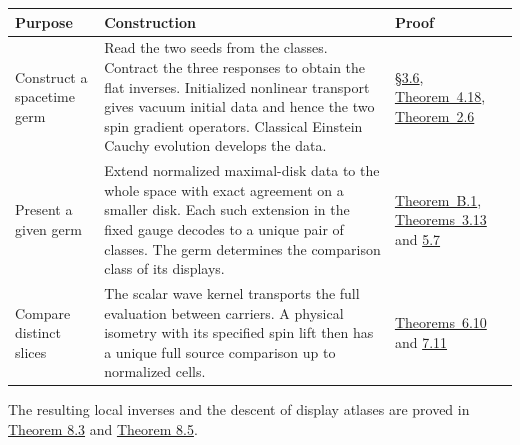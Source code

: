 \documentclass[
  english,
  11pt,
  reqno]{amsart}
\newcounter{none} %
\begin{document}
{\def\LTcaptype{none} %
\begin{longtable}[]{@{}
  >{\raggedright\arraybackslash}p{}
  >{\raggedright\arraybackslash}p{}
  >{\raggedright\arraybackslash}p{}@{}}
\toprule\noalign{}
\begin{minipage}[b]{\linewidth}\raggedright
Purpose
\end{minipage} & \begin{minipage}[b]{\linewidth}\raggedright
Construction
\end{minipage} & \begin{minipage}[b]{\linewidth}\raggedright
Proof
\end{minipage} \\
\midrule\noalign{}
\endhead
\bottomrule\noalign{}
\endlastfoot
Construct a spacetime germ & Read the two seeds from the classes.
Contract the three responses to obtain the flat inverses. Initialized
nonlinear transport gives vacuum initial data and hence the two spin
gradient operators. Classical Einstein Cauchy evolution develops the
data. & \hyperref[sec:online-ordinary-data-construction]{§3.6},
\hyperref[thm:online-ordinary-negative-response-initial-source]{Theorem~4.18}, \hyperref[thm:online-smooth-local-cauchy-input]{Theorem~2.6} \\
Present a given germ & Extend normalized maximal-disk data to the whole
space with exact agreement on a smaller disk. Each such extension in the
fixed gauge decodes to a unique pair of classes. The germ determines the
comparison class of its displays. &
\hyperref[thm:online-relative-extension-one-branch]{Theorem~B.1},
\hyperref[thm:online-ordinary-pair-data-bijection]{Theorems~3.13} and
\hyperref[thm:submission-vacuum-germ-coverage]{5.7} \\
Compare distinct slices & The scalar wave kernel transports the full
evaluation between carriers. A physical isometry with its specified spin
lift then has a unique full source comparison up to normalized cells. &
\hyperref[thm:online-canonical-wave-kernel]{Theorems~6.10} and
\hyperref[thm:online-full-unmarked-source-hom]{7.11} \\
\end{longtable}
}

The resulting local inverses and the descent of display atlases are
proved in \hyperref[thm:local-two-inverses]{Theorem 8.3} and
\hyperref[thm:local-display-atlas-descent]{Theorem 8.5}.
\end{document}
